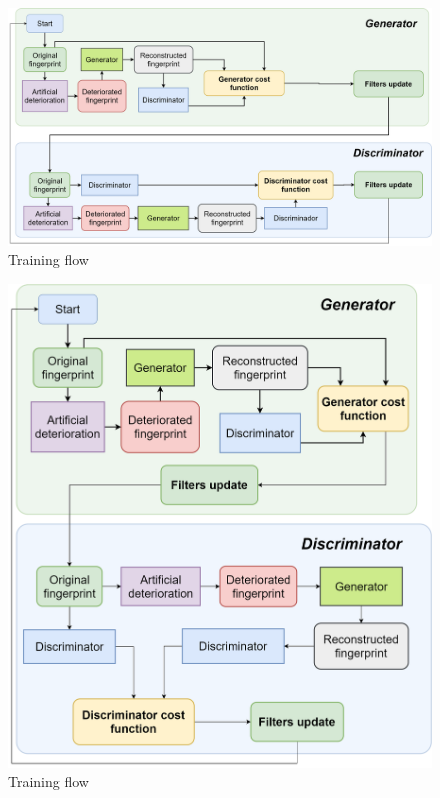 \documentclass[a4paper,fleqn]{cas-dc}
\begin{document}
\begin{figure}[htbp]
\centerline{\includegraphics[scale=0.4]{figs/training_fd_en_h.png}}
\caption{Training flow}
\label{figa1}
\end{figure}

\begin{figure}[htbp]
\centerline{\includegraphics[scale=0.4]{figs/training_fd_en_v.png}}
\caption{Training flow}
\label{figa2}
\end{figure}
\end{document}
